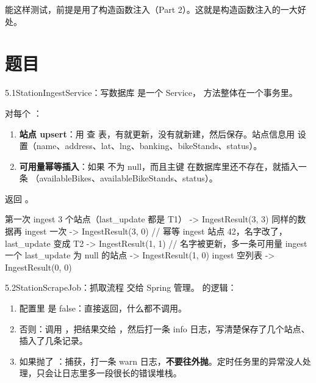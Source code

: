 能这样测试，前提是用了构造函数注入（Part 2）。这就是构造函数注入的一大好处。

\section{题目}

\begin{task}{5.1\quad StationIngestService：写数据库}
 是一个 Service， 方法整体在一个事务里。

对每个 ：
\begin{enumerate}
  \item \textbf{站点 upsert}：用  查  表，有就更新，没有就新建，然后保存。站点信息用  设置（name、address、lat、lng、banking、bikeStands、status）。
  \item \textbf{可用量幂等插入}：如果  不为 null，而且主键  在数据库里还不存在，就插入一条 （availableBikes、availableBikeStands、status）。
\end{enumerate}

返回 。

\begin{example}
\begin{plaincode}
第一次 ingest 3 个站点（last_update 都是 T1）     ->  IngestResult(3, 3)
同样的数据再 ingest 一次                         ->  IngestResult(3, 0)   // 幂等
ingest 站点 42，名字改了，last_update 变成 T2    ->  IngestResult(1, 1)   // 名字被更新，多一条可用量
ingest 一个 last_update 为 null 的站点           ->  IngestResult(1, 0)
ingest 空列表                                   ->  IngestResult(0, 0)
\end{plaincode}
\end{example}
\end{task}

\begin{task}{5.2\quad StationScrapeJob：抓取流程}
 交给 Spring 管理。 的逻辑：
\begin{enumerate}
  \item 配置里  是 false：直接返回，什么都不调用。
  \item 否则：调用 ，把结果交给 ，然后打一条 info 日志，写清楚保存了几个站点、插入了几条记录。
  \item 如果抛了 ：捕获，打一条 warn 日志，\textbf{不要往外抛}。定时任务里的异常没人处理，只会让日志里多一段很长的错误堆栈。
\end{enumerate}
\end{task}

